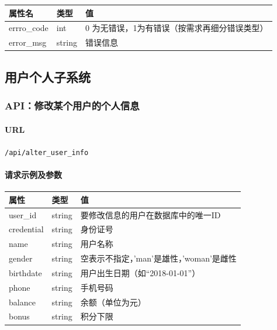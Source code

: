 \documentclass[]{article}
\let\oldparagraph\paragraph
\renewcommand{\paragraph}[1]{\oldparagraph{#1}\mbox{}}
\begin{document}
\begin{longtable}[]{@{}lll@{}}
\toprule
属性名 & 类型 & 值\tabularnewline
\midrule
\endhead
errro\_code & int & 0
为无错误，1为有错误（按需求再细分错误类型）\tabularnewline
error\_msg & string & 错误信息\tabularnewline
\bottomrule
\end{longtable}

\hypertarget{ux7528ux6237ux4e2aux4ebaux5b50ux7cfbux7edf}{%
\subsection{用户个人子系统}\label{ux7528ux6237ux4e2aux4ebaux5b50ux7cfbux7edf}}

\hypertarget{apiux4feeux6539ux67d0ux4e2aux7528ux6237ux7684ux4e2aux4ebaux4fe1ux606f}{%
\subsubsection{API：修改某个用户的个人信息}\label{apiux4feeux6539ux67d0ux4e2aux7528ux6237ux7684ux4e2aux4ebaux4fe1ux606f}}

\hypertarget{url-3}{%
\paragraph{URL}\label{url-3}}

\texttt{/api/alter\_user\_info}

\hypertarget{ux8bf7ux6c42ux793aux4f8bux53caux53c2ux6570-2}{%
\paragraph{请求示例及参数}\label{ux8bf7ux6c42ux793aux4f8bux53caux53c2ux6570-2}}

\begin{Shaded}
\begin{Highlighting}[]
\FunctionTok{\{}
    \FunctionTok{:} \FunctionTok{,}
    \FunctionTok{:}\FunctionTok{,}
    \FunctionTok{:}\FunctionTok{,}
    \ErrorTok{//} 
\FunctionTok{\}}
\end{Highlighting}
\end{Shaded}

\begin{longtable}[]{@{}lll@{}}
\toprule
属性 & 类型 & 值\tabularnewline
\midrule
\endhead
user\_id & string & 要修改信息的用户在数据库中的唯一ID\tabularnewline
credential & string & 身份证号\tabularnewline
name & string & 用户名称\tabularnewline
gender & string &
空表示不指定，'man'是雄性，'woman'是雌性\tabularnewline
birthdate & string & 用户出生日期（如``2018-01-01''）\tabularnewline
phone & string & 手机号码\tabularnewline
balance & string & 余额（单位为元）\tabularnewline
bonus & string & 积分下限\tabularnewline
\bottomrule
\end{longtable}
\end{document}
